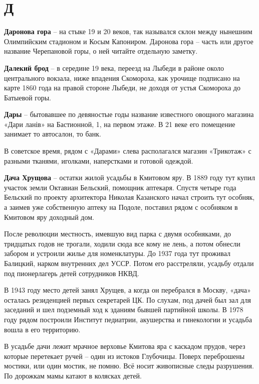 \chapter*{Д}


\textbf{Даронова гора} – на стыке 19 и 20 веков, так назывался склон между нынешним Олимпийским стадионом и Косым Капониром. Даронова гора – часть или другое название Черепановой горы, о ней читайте отдельную заметку.\\

\medskip


\textbf{Далекий брод} – в середине 19 века, переезд на Лыбеди в районе около центрального вокзала, ниже впадения Скомороха, как урочище подписано на карте 1860 года на правой стороне Лыбеди, не доходя от устья Скомороха до Батыевой горы.\\

\medskip

\textbf{Дары} – бытовавшее по девяностые годы название известного овощного магазина «Дари ланів» на Бастионной, 1, на первом этаже. В 21 веке его помещение занимает то автосалон, то банк.

В советское время, рядом с «Дарами» слева располагался магазин «Трикотаж» с разными тканями, иголками, наперстками и готовой одеждой.\\

\medskip

\textbf{Дача Хрущова} – остатки жилой усадьбы в Кмитовом яру. В 1889 году тут купил участок земли Октавиан Бельский, помощник аптекаря. Спустя четыре года Бельский по проекту архитектора Николая Казанского начал строить тут особняк, а заимев уже собственную аптеку на Подоле, поставил рядом с особняком в Кмитовом яру доходный дом.

После революции местность, имевшую вид парка с двумя особняками, до тридцатых годов не трогали, ходили сюда все кому не лень, а потом обнесли забором и устроили жилье для номенклатуры. До 1937 года тут проживал Балицкий, нарком внутренних дел УССР. Потом его расстреляли, усадьбу отдали под пионерлагерь детей сотрудников НКВД.

В 1943 году место детей занял Хрущев, а когда он перебрался в Москву, «дача» осталась резиденцией первых секретарей ЦК. По слухам, под дачей был зал для заседаний и шел подземный ход к зданиям бывшей партийной школы. В 1978 году рядом построили Институт педиатрии, акушерства и гинекологии и усадьба вошла в его территорию.

В усадьбе дачи лежит мрачное верховье Кмитова яра с каскадом прудов, через которые перетекает ручей – один из истоков Глубочицы. Поверх переброшены мостики, или один мостик, не помню. Всё носит живописные следы разрушения. По дорожкам мамы катают в колясках детей.\\


